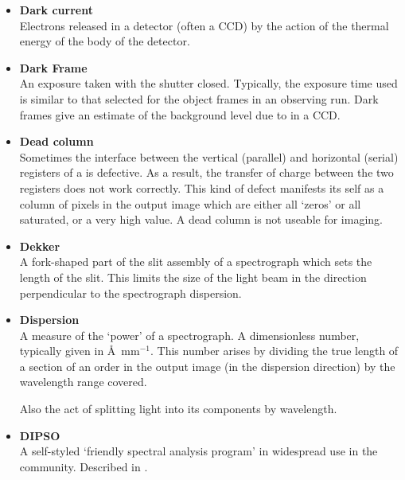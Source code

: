 {{\begin{itemize}
\item {\bf\label{gl_dark_current}Dark current}\\
      Electrons released in a detector (often a CCD) by the action of
      the thermal energy of the body of the detector.

\item {\bf\label{gl_dark_frame}Dark Frame}\\
      An exposure taken with the shutter closed.  Typically, the
      exposure time used is similar to that selected for the object
      frames in an observing run.  Dark frames give an estimate of
      the background level due to 
      in a CCD.

\item {\bf\label{gl_dead_column}Dead column}\\
      Sometimes the interface between the vertical (parallel) and horizontal
      (serial) registers of a  is defective.  As a
      result, the transfer of charge between the two registers does not
      work correctly.  This kind of defect manifests its self as a column
      of pixels in the output image which are either all `zeros' or all
      saturated, or a very high value.  A dead column is not useable
      for imaging.

\item {\bf\label{gl_dekker}Dekker}\\
      A fork-shaped part of the slit assembly of a spectrograph which
      sets the length of the slit.  This limits the size of the light
      beam in the direction perpendicular to the spectrograph dispersion.

\item {\bf\label{gl_dispersion}Dispersion}\\
      A measure of the `power' of a spectrograph. A dimensionless number,
      typically given in \AA\ mm${}^{-1}$.  This number arises by dividing
      the true
      length of a section of an order in the output image (in the
      dispersion direction) by the wavelength range covered.

      Also the act of splitting light into its components by wavelength.

\item {\bf\label{gl_dipso}DIPSO}\\
      A self-styled `friendly spectral analysis program' in
      widespread use in the community.  Described in
      .


\end{itemize}}}
